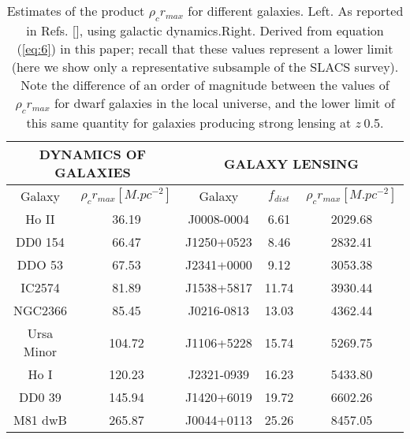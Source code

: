 \documentclass{article}
\begin{document}
\begin{table}[h!]
\begin{center}
\begin{tabular}{|c|c|c|c|c|}
\hline
\multicolumn{2}{|c|}{DYNAMICS OF GALAXIES} & \multicolumn{3}{|c|}{GALAXY LENSING}\\
\hline
Galaxy & $\rho_cr_{max}[M.pc^{-2}]$ & Galaxy & $f_{dist}$ & $\rho_cr_{max}[M.pc^{-2}]$\\
\hline
Ho II & 36.19 & J0008-0004 & 6.61 & 2029.68\\
DD0  154 & 66.47 & J1250+0523 & 8.46 & 2832.41\\
DDO 53 & 67.53 & J2341+0000 & 9.12 & 3053.38\\
IC2574 & 81.89 & J1538+5817 & 11.74 & 3930.44\\
NGC2366 & 85.45 & J0216-0813 & 13.03 & 4362.44\\
Ursa Minor & 104.72 & J1106+5228 & 15.74 & 5269.75\\
Ho I & 120.23 & J2321-0939 & 16.23 & 5433.80\\
DD0 39 & 145.94 & J1420+6019 & 19.72 & 6602.26\\
M81 dwB & 265.87 & J0044+0113 & 25.26 & 8457.05\\
\hline
\end{tabular}
\caption{Estimates of the product $\rho_cr_{max}$ for different galaxies. Left. As reported in Refs. [\cite{7}], using galactic dynamics.Right. Derived from equation (\ref{eq:6}) in this paper; recall that these values represent a lower limit (here we show only a representative subsample of the SLACS survey). Note the difference of an order of magnitude between the values of $\rho_cr_{max}$ for dwarf galaxies
in the local universe, and the lower limit of this same quantity for galaxies producing strong lensing at $z~0.$5.}
\label{TABLE I}
\end{center}
\end{table}
\end{document}
